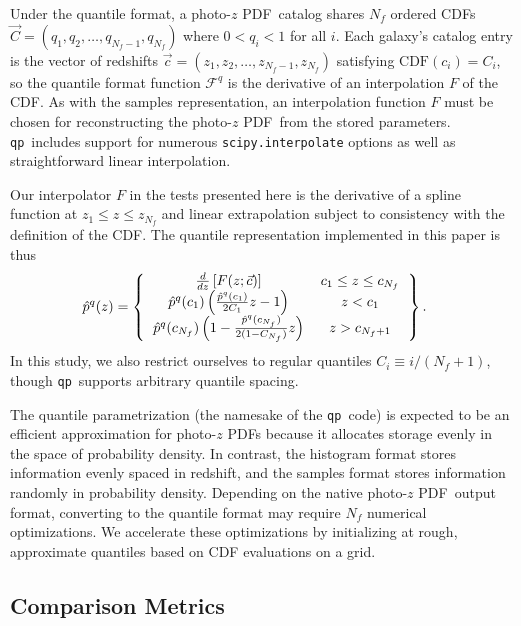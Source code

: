 \documentclass[\docopts]{\docclass}
\newcommand{\qp}{\texttt{qp}}
\newcommand{\pz}{photo-$z$ PDF}
\begin{document}
Under the quantile format, a \pz\ catalog shares $N_{f}$ ordered CDFs $\vec{C} 
= (q_{1}, q_{2}, \dots, q_{N_{f}-1}, q_{N_{f}})$ where $0 < q_{i} < 1$ for all 
$i$.
Each galaxy's catalog entry is the vector of redshifts $\vec{c} = (z_{1}, 
z_{2}, \dots, z_{N_{f}-1}, z_{N_{f}})$ satisfying $\mathrm{CDF}(c_{i}) = 
C_{i}$, so the quantile format function $\mathcal{F}^{q}$ is the derivative of 
an interpolation $F$ of the CDF.
As with the samples representation, an interpolation function $F$ must be 
chosen for reconstructing the \pz\ from the stored parameters.
\qp\ includes support for numerous \texttt{scipy.interpolate} options as well 
as straightforward linear interpolation.

Our interpolator $F$ in the tests presented here is the derivative of a spline 
function at $z_{1} \leq z \leq z_{N_{f}}$ and linear extrapolation subject to 
consistency with the definition of the CDF.
The quantile representation implemented in this paper is thus
\begin{align}
  \label{eq:quantiles}
  \hat{p}^{q}(z) &=
  \left\{
  \begin{tabular}{cc}
  $\frac{d}{dz} \left[F(z; \vec{c}
  )\right]$ & $c_{1} \leq z \leq c_{N_{f}}$ \\
  $\hat{p}^{q}(c_{1})\left(\frac{\hat{p}^{q}(c_{1})}{2C_{1}} z - 1\right)$ & $z 
< c_{1}$ \\
  $\hat{p}^{q}(c_{N_{f}})\left(1 - \frac{\hat{p}^{q}(c_{N_{f}})}{2(1 - 
C_{N_{f}})} z\right)$ & $z > c_{N_{f}+1}$
  \end{tabular}
  \right\}.
\end{align}
In this study, we also restrict ourselves to regular quantiles $C_{i} \equiv i 
/ (N_{f} + 1)$, though \qp\ supports arbitrary quantile spacing.


The quantile parametrization (the namesake of the \qp\ code) is expected to be 
an efficient approximation for \pz s because it allocates storage evenly in the 
space of probability density.
In contrast, the histogram format stores information evenly spaced in redshift, 
and the samples format stores information randomly in probability density.
Depending on the native \pz\ output format, converting to the quantile format 
may require $N_{f}$ numerical optimizations.
We accelerate these optimizations by initializing at rough, approximate 
quantiles based on CDF evaluations on a grid.





\subsection{Comparison Metrics}
\label{sec:metric}
\end{document}
